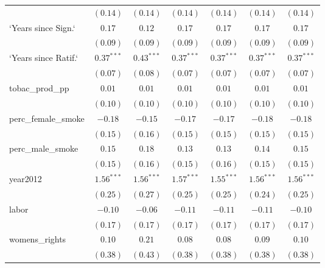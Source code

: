 \begin{table}[!h]
\begin{center}
\begin{tabular}{l c c c c c c }
                        & $(0.14)$     & $(0.14)$     & $(0.14)$     & $(0.14)$     & $(0.14)$     & $(0.14)$     \\
`Years since Sign.`     & $0.17$       & $0.12$       & $0.17$       & $0.17$       & $0.17$       & $0.17$       \\
                        & $(0.09)$     & $(0.09)$     & $(0.09)$     & $(0.09)$     & $(0.09)$     & $(0.09)$     \\
`Years since Ratif.`    & $0.37^{***}$ & $0.43^{***}$ & $0.37^{***}$ & $0.37^{***}$ & $0.37^{***}$ & $0.37^{***}$ \\
                        & $(0.07)$     & $(0.08)$     & $(0.07)$     & $(0.07)$     & $(0.07)$     & $(0.07)$     \\
tobac\_prod\_pp         & $0.01$       & $0.01$       & $0.01$       & $0.01$       & $0.01$       & $0.01$       \\
                        & $(0.10)$     & $(0.10)$     & $(0.10)$     & $(0.10)$     & $(0.10)$     & $(0.10)$     \\
perc\_female\_smoke     & $-0.18$      & $-0.15$      & $-0.17$      & $-0.17$      & $-0.18$      & $-0.18$      \\
                        & $(0.15)$     & $(0.16)$     & $(0.15)$     & $(0.15)$     & $(0.15)$     & $(0.15)$     \\
perc\_male\_smoke       & $0.15$       & $0.18$       & $0.13$       & $0.13$       & $0.14$       & $0.15$       \\
                        & $(0.15)$     & $(0.16)$     & $(0.15)$     & $(0.16)$     & $(0.15)$     & $(0.15)$     \\
year2012                & $1.56^{***}$ & $1.56^{***}$ & $1.57^{***}$ & $1.55^{***}$ & $1.56^{***}$ & $1.56^{***}$ \\
                        & $(0.25)$     & $(0.27)$     & $(0.25)$     & $(0.25)$     & $(0.24)$     & $(0.25)$     \\
labor                   & $-0.10$      & $-0.06$      & $-0.11$      & $-0.11$      & $-0.11$      & $-0.10$      \\
                        & $(0.17)$     & $(0.17)$     & $(0.17)$     & $(0.17)$     & $(0.17)$     & $(0.17)$     \\
womens\_rights          & $0.10$       & $0.21$       & $0.08$       & $0.08$       & $0.09$       & $0.10$       \\
                        & $(0.38)$     & $(0.43)$     & $(0.38)$     & $(0.38)$     & $(0.38)$     & $(0.38)$     \\

\end{tabular}
\end{center}
\end{table}

